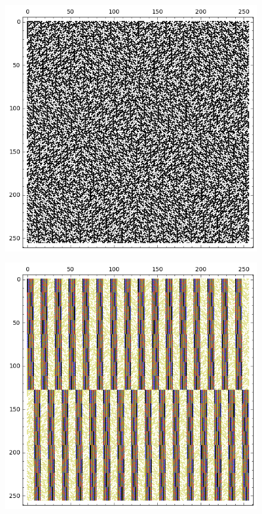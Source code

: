 \documentclass[12pt,a4paper]{article}
\begin{document}
\begin{figure}[!hb]
\centering
\begin{minipage}{.48\textwidth}
  \centering
  \includegraphics[width=.9\linewidth]{../matrix_plot/re8_5_weight_class_matrix.png}
  \label{fig:8_5_weight_class_matrix}
\end{minipage}%
\begin{minipage}{.48\textwidth}
  \centering
  \includegraphics[width=.9\linewidth]{../matrix_plot/re8_5_bent_cayley_graph_index_matrix.png}
  \label{fig:8_5_bent_cayley_graph_index_matrix}
\end{minipage}
\end{figure}
~
\end{document}
